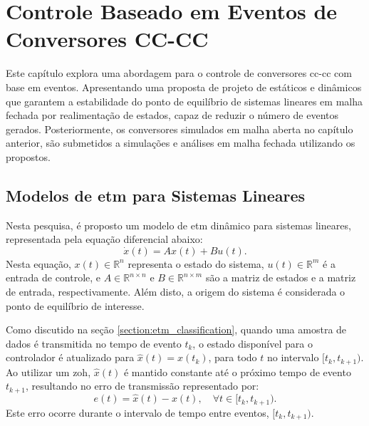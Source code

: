 \chapter{Controle Baseado em Eventos de Conversores CC-CC} \label{cap4}

Este capítulo explora uma abordagem para o controle de conversores \acrshort{cc}-\acrshort{cc} com base em eventos. Apresentando uma proposta de projeto de  estáticos e dinâmicos que garantem a estabilidade do ponto de equilíbrio de sistemas lineares em malha fechada por realimentação de estados,  capaz de reduzir o número de eventos gerados. Posteriormente, os conversores simulados em malha aberta no capítulo anterior, são submetidos a simulações e análises em malha fechada utilizando os  propostos.

\section{Modelos de \acrshort{etm} para Sistemas Lineares} \label{section:etm_models}

Nesta pesquisa, é proposto um modelo de \acrshort{etm} dinâmico para sistemas lineares, representada pela equação diferencial abaixo: \begin{equation} \dot{x}(t) = Ax(t) + Bu(t). \label{eq:linear_system_etm}\end{equation} Nesta equação, $ x(t) \in \mathbb{R}^n $ representa o estado do sistema, $ u(t) \in \mathbb{R}^m $ é a entrada de controle, e $ A \in \mathbb{R}^{n \times n} $ e $ B \in \mathbb{R}^{n \times m}$ são a matriz de estados e a matriz de entrada, respectivamente. Além disto, a origem do sistema é considerada o ponto de equilíbrio de interesse.

Como discutido na seção \ref{section:etm_classification}, quando uma amostra de dados é transmitida no tempo de evento $t_k$, o estado disponível para o controlador é atualizado para $\hat{x}(t) = x(t_k)$, para todo $t$ no intervalo $[t_k, t_{k+1})$. Ao utilizar um \acrshort{zoh}, $\hat{x}(t)$ é mantido constante até o próximo tempo de evento $t_{k+1}$, resultando no erro de transmissão representado por: \begin{equation}
  e(t) = \hat{x}(t) - x(t), \quad \forall t \in [t_k, t_{k+1}).
\end{equation} Este erro ocorre durante o intervalo de tempo entre eventos, $ [t_k, t_{k+1})$.


